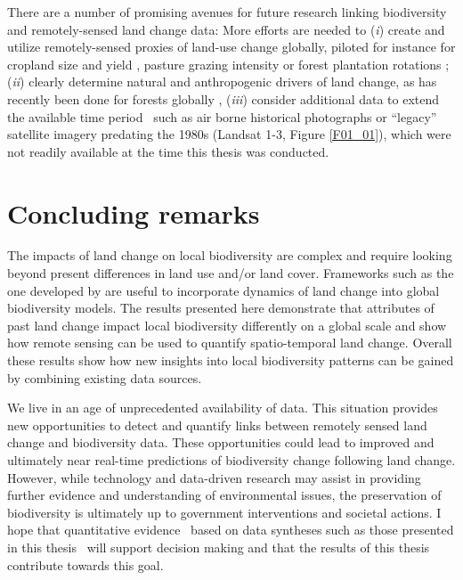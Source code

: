 There are a number of promising avenues for future research linking biodiversity and remotely-sensed land change data: More efforts are needed to (\textit{i}) create and utilize remotely-sensed proxies of land-use change globally, piloted for instance for cropland size \citep{Fritz2015} and yield \citep{Lobell2015}, pasture grazing intensity \citep{Rufin2015,Aguiar2017} or forest plantation rotations \citep{LeMaire2014}; (\textit{ii}) clearly determine natural and anthropogenic drivers of land change, as has recently been done for forests globally \citep{Curtis2018}, (\textit{iii}) consider additional data to extend the available time period \textendash\ such as air borne historical photographs \citep{SZABO2011,Cousins2015} or “legacy” satellite imagery predating the 1980s (\eg Landsat 1-3, Figure \ref{F01_01}), which were not readily available at the time this thesis was conducted.

\section{Concluding remarks}
\label{C06_04}

The impacts of land change on local biodiversity are complex and require looking beyond present differences in land use and/or land cover. Frameworks such as the one developed by \cite{Watson2014} are useful to incorporate dynamics of land change into global biodiversity models. The results presented here demonstrate that attributes of past land change impact local biodiversity differently on a global scale and show how remote sensing can be used to quantify spatio-temporal land change. Overall these results show how new insights into local biodiversity patterns can be gained by combining existing data sources.

We live in an age of unprecedented availability of data. This situation provides new opportunities to detect and quantify links between remotely sensed land change and biodiversity data. These opportunities could lead to improved and ultimately near real-time predictions of biodiversity change following land change. However, while technology and data-driven research may assist in providing further evidence and understanding of environmental issues, the preservation of biodiversity is ultimately up to government interventions and societal actions. I hope that quantitative evidence \textendash\ based on data syntheses such as those presented in this thesis \textendash\ will support decision making and that the results of this thesis contribute towards this goal.    


\clearpage
%

%  
